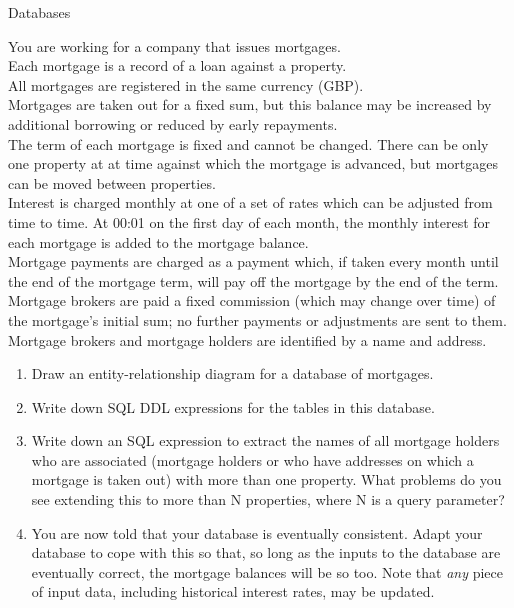 \documentclass{tripos}
\begin{document}
\begin{question}[MockIA,year=2025,paper=1,question=6,author=nobody]{Databases}

  You are working for a company that issues mortgages.\\
  Each mortgage is a record of a loan against a property.\\
  All mortgages are registered in the same currency (GBP).\\
  Mortgages are taken out for a fixed sum, but this balance may be increased by additional borrowing or reduced by early repayments.\\
  The term of each mortgage is fixed and cannot be changed. There can be only one property at at time against which the mortgage is advanced, but mortgages can be moved between properties.\\
  Interest is charged monthly at one of a set of rates which can be adjusted from time to time. At 00:01 on the first day of each month, the monthly interest for each mortgage is added to the mortgage balance.\\
  Mortgage payments are charged as a payment which, if taken every month until the end of the mortgage term, will pay off the mortgage by the end of the term.\\
  Mortgage brokers are paid a fixed commission (which may change over time) of the mortgage's initial sum; no further payments or adjustments are sent to them.\\
  Mortgage brokers and mortgage holders are identified by a name and address.\\
  \begin{enumerate}
  \item Draw an entity-relationship diagram for a database of mortgages. 
  \item Write down SQL DDL expressions for the tables in this database. 
  \item Write down an SQL expression to extract the names of all mortgage holders who are associated (mortgage holders or who have addresses on which a mortgage is taken out) with more than one property. What problems do you see extending this to more than N properties, where N is a query parameter?
  \item You are now told that your database is eventually consistent. Adapt your database to cope with this so that, so long as the inputs to the database are eventually correct, the mortgage balances will be so too. Note that {\em any} piece of input data, including historical interest rates, may be updated. 

\end{enumerate}
\end{question}
\end{document}
